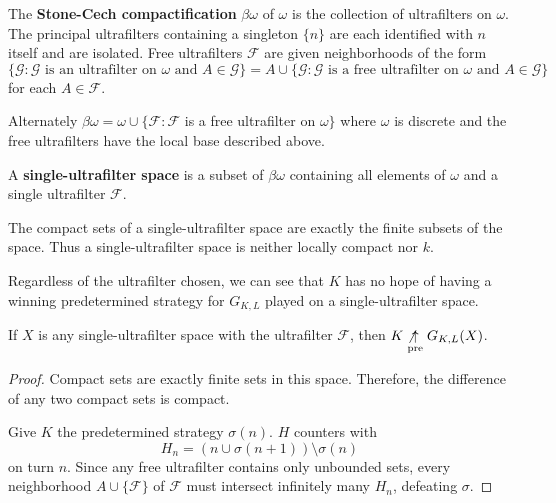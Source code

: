 \begin{definition}
The \textbf{Stone-Cech compactification} $\beta\omega$ of $\omega$ is the collection of ultrafilters on $\omega$. The principal ultrafilters containing a singleton $\{n\}$ are each identified with $n$ itself and are isolated. Free ultrafilters $\mathcal{F}$ are given neighborhoods of the form \[\{\mathcal{G} : \mathcal{G} \text{ is an ultrafilter on } \omega \text{ and } A \in \mathcal{G}\} = A \cup \{\mathcal{G}: \mathcal{G} \text{ is a free ultrafilter on } \omega \text{ and } A \in \mathcal{G}\}\] for each $A\in\mathcal{F}$.

Alternately $\beta\omega=\omega\cup\{\mathcal{F} : \mathcal{F}$ is a free ultrafilter on $\omega\}$ where $\omega$ is discrete and the free ultrafilters have the local base described above.
\end{definition}

\begin{definition}
A \textbf{single-ultrafilter space} is a subset of $\beta\omega$ containing all elements of $\omega$ and a single ultrafilter $\mathcal{F}$.
\end{definition}

\begin{proposition}
The compact sets of a single-ultrafilter space are exactly the finite subsets of the space. Thus a single-ultrafilter space is neither locally compact nor $k$.
\end{proposition}

Regardless of the ultrafilter chosen, we can see that $K$ has no hope of having a winning predetermined strategy for $G_{K,L}$ played on a single-ultrafilter space.

\begin{proposition}
If $X$ is any single-ultrafilter space with the ultrafilter $\mathcal{F}$, then $K\not\underset{\text{pre}}{\uparrow} G_{K,L}(X)$.
\end{proposition}

\begin{proof}
Compact sets are exactly finite sets in this space. Therefore, the difference of any two compact sets is compact.

Give $K$ the predetermined strategy $\sigma(n)$. $H$ counters with \[H_n=(n\cup\sigma(n+1))\setminus\sigma(n)\] on turn $n$. Since any free ultrafilter contains only unbounded sets, every neighborhood $A\cup\{\mathcal{F}\}$ of $\mathcal{F}$ must intersect infinitely many $H_n$, defeating $\sigma$.
\end{proof}

